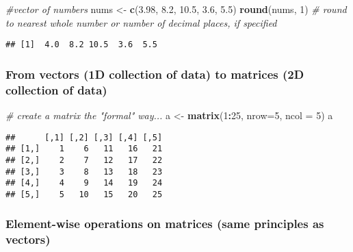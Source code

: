 \documentclass[
]{article}
\newenvironment{Shaded}{\begin{snugshade}}{\end{snugshade}}
\newcommand{\CommentTok}[1]{\textcolor[rgb]{0.56,0.35,0.01}{\textit{#1}}}
\newcommand{\DataTypeTok}[1]{\textcolor[rgb]{0.13,0.29,0.53}{#1}}
\newcommand{\DecValTok}[1]{\textcolor[rgb]{0.00,0.00,0.81}{#1}}
\newcommand{\FloatTok}[1]{\textcolor[rgb]{0.00,0.00,0.81}{#1}}
\newcommand{\KeywordTok}[1]{\textcolor[rgb]{0.13,0.29,0.53}{\textbf{#1}}}
\newcommand{\NormalTok}[1]{#1}
\newcommand{\OperatorTok}[1]{\textcolor[rgb]{0.81,0.36,0.00}{\textbf{#1}}}
\newcommand{\StringTok}[1]{\textcolor[rgb]{0.31,0.60,0.02}{#1}}
\begin{document}
\begin{Shaded}
\begin{Highlighting}[]
\CommentTok{#vector of numbers}
\NormalTok{nums <-}\StringTok{ }\KeywordTok{c}\NormalTok{(}\FloatTok{3.98}\NormalTok{, }\FloatTok{8.2}\NormalTok{, }\FloatTok{10.5}\NormalTok{, }\FloatTok{3.6}\NormalTok{, }\FloatTok{5.5}\NormalTok{)}
\KeywordTok{round}\NormalTok{(nums, }\DecValTok{1}\NormalTok{) }\CommentTok{# round to nearest whole number or number of decimal places, if specified}
\end{Highlighting}
\end{Shaded}

\begin{verbatim}
## [1]  4.0  8.2 10.5  3.6  5.5
\end{verbatim}

\hypertarget{from-vectors-1d-collection-of-data-to-matrices-2d-collection-of-data}{%
\subsubsection{From vectors (1D collection of data) to matrices (2D
collection of
data)}\label{from-vectors-1d-collection-of-data-to-matrices-2d-collection-of-data}}

\begin{Shaded}
\begin{Highlighting}[]
\CommentTok{# create a matrix the "formal" way...}
\NormalTok{a <-}\StringTok{ }\KeywordTok{matrix}\NormalTok{(}\DecValTok{1}\OperatorTok{:}\DecValTok{25}\NormalTok{, }\DataTypeTok{nrow=}\DecValTok{5}\NormalTok{, }\DataTypeTok{ncol =} \DecValTok{5}\NormalTok{)}
\NormalTok{a}
\end{Highlighting}
\end{Shaded}

\begin{verbatim}
##      [,1] [,2] [,3] [,4] [,5]
## [1,]    1    6   11   16   21
## [2,]    2    7   12   17   22
## [3,]    3    8   13   18   23
## [4,]    4    9   14   19   24
## [5,]    5   10   15   20   25
\end{verbatim}

\hypertarget{element-wise-operations-on-matrices-same-principles-as-vectors}{%
\subsubsection{Element-wise operations on matrices (same principles as
vectors)}\label{element-wise-operations-on-matrices-same-principles-as-vectors}}
\end{document}
